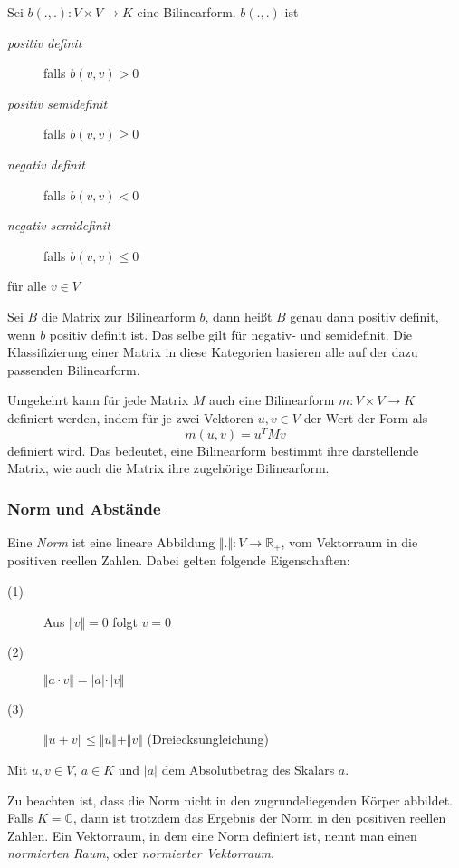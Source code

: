 \begin{definition}
Sei $b(.,.) : V\times V \longrightarrow K$ eine Bilinearform. $b(.,.)$ ist

\begin{description}
\item[\emph{positiv definit}] falls $b(v,v)>0$
\item[\emph{positiv semidefinit}] falls $b(v,v)\ge 0$
\item[\emph{negativ definit}] falls $b(v,v) <0$
\item[\emph{negativ semidefinit}] falls $b(v,v)\le 0$
\end{description}
für alle $v\in V $
\end{definition}

Sei $B$ die Matrix zur Bilinearform $b$, dann heißt $B$ genau dann positiv definit, wenn $b$ positiv definit ist. Das selbe gilt für negativ- und semidefinit. Die Klassifizierung einer Matrix in diese Kategorien basieren alle auf der dazu passenden Bilinearform. 

Umgekehrt kann für jede Matrix $M$ auch eine Bilinearform $m :V\times V \longrightarrow K$ definiert werden, indem für je zwei Vektoren $u,v\in V$ der Wert der Form als 
\[
m(u,v) = u^T M v
\]
definiert wird. Das bedeutet, eine Bilinearform bestimmt ihre darstellende Matrix, wie auch die Matrix ihre zugehörige Bilinearform.

\subsubsection{Norm und Abstände}

\begin{definition}
Eine \emph{Norm} ist eine lineare Abbildung $\Vert . \Vert : V \longrightarrow \mathbb{R}_+$, vom Vektorraum in die positiven reellen Zahlen. Dabei gelten folgende Eigenschaften:
\begin{description}
\item[(1)] Aus $\Vert v\Vert = 0$ folgt $v=0$
\item[(2)] $\Vert a\cdot v\Vert = \vert a\vert \cdot \Vert v\Vert$
\item[(3)] $\Vert u+v\Vert \le \Vert u\Vert + \Vert v\Vert $ (Dreiecksungleichung)
\end{description}
Mit $u,v\in V$, $a\in K$ und $\vert a\vert$ dem Absolutbetrag des Skalars $a$.
\end{definition}
Zu beachten ist, dass die Norm nicht in den zugrundeliegenden Körper abbildet. Falls $K=\mathbb{C}$, dann ist trotzdem das Ergebnis der Norm in den positiven reellen Zahlen. Ein Vektorraum, in dem eine Norm definiert ist, nennt man einen \emph{normierten Raum}, oder \emph{normierter Vektorraum}.

